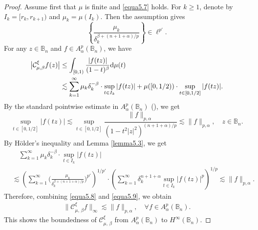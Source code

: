\documentclass[preprint,12pt,times]{elsarticle}
\theoremstyle{definition}
\theoremstyle{remark}
\numberwithin{equation}{section}
\begin{document}
\begin{proof}
Assume first that $\mu$ is finite and \eqref{equa5.7} holds. For $k\geq 1$, denote by $I_k=[r_k,r_{k+1})$ and $\mu_k=\mu(I_k)$. Then the assumption gives 
\[
    \left\{\frac{\mu_k}{\delta_k^{\beta+(n+1+\alpha)/p}}\right\}\in \ell^{p'}.
\] 
For any $z\in\mathbb{B}_n$ and $f\in A_{\alpha}^p(\mathbb{B}_n)$, we have
\begin{align*}
\big|\mathcal{C}_{\mu,\beta}^{\xi}f(z)\big|&\leq \int_{[0,1)}\frac{|f(tz)|}{(1-t)^{\beta}}{\rm d}\mu(t)\\
&\lesssim \sum_{k=1}^{\infty}\mu_k\delta_k^{-\beta}\cdot\sup_{t\in I_k}|f(tz)|+\mu([0,1/2))\cdot\sup_{t\in [0,1/2]}|f(tz)|.
\end{align*}
By the standard pointwise estimate in $A_{\alpha}^p(\mathbb{B}_n)$ (\cite[Theorem 2.1]{Zhu2005}), we get
\begin{equation}\label{equa5.8}
\sup_{t\in [0,1/2]}|f(tz)|
\lesssim \sup_{t\in[0,1/2]}
\frac{\|f\|_{p,\alpha}}{(1-t^2|z|^2)^{(n+1+\alpha)/p}}
\lesssim \|f\|_{p,\alpha},\quad z\in \mathbb{B}_n.
\end{equation}
By H\"older's inequality and Lemma \ref{lemma5.3}, we get
\begin{equation}\label{equa5.9}
\begin{split}
&\quad\sum_{k=1}^{\infty}\mu_k\delta_k^{-\beta}\cdot\sup_{t\in I_k}|f(tz)|\\
&\lesssim \left(\sum_{k=1}^{\infty}\Big(\frac{\mu_k}{\delta_k^{\beta+(n+1+\alpha)/p}}\Big)^{p'}\right)^{1/p'}\cdot\left(\sum_{k=1}^{\infty}\delta_k^{n+1+\alpha}\sup_{t\in I_k}|f(tz)|^p\right)^{1/p}\lesssim \|f\|_{p,\alpha}.
\end{split}
\end{equation}
Therefore, combining \eqref{equa5.8} and \eqref{equa5.9}, we obtain
\begin{align*}
\|\mathcal{C}_{\mu,\,\beta}^{\xi}f\|_{\infty}\lesssim \|f\|_{p,\alpha},\quad \forall f\in A_{\alpha}^p(\mathbb{B}_n).
\end{align*}
This shows the boundedness  of $\mathcal{C}_{\mu,\,\beta}^{\xi}$ from $A_{\alpha}^p(\mathbb{B}_n)$ to $H^{\infty}(\mathbb{B}_n)$.


\end{proof}
\end{document}
